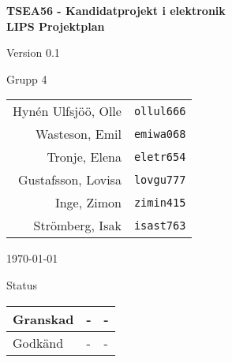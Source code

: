 \documentclass[11pt]{article}
\begin{document}
\begin{titlepage}
\begin{center}

{\Large\bfseries TSEA56 - Kandidatprojekt i elektronik \\ LIPS Projektplan}

\vspace{5em}

Version 0.1

\vspace{5em}
Grupp 4 \\
\begin{tabular}{rl}
Hynén Ulfsjöö, Olle&\verb+ollul666+
\\
Wasteson, Emil&\verb+emiwa068+
\\
Tronje, Elena&\verb+eletr654+
\\
Gustafsson, Lovisa&\verb+lovgu777+
\\
Inge, Zimon&\verb+zimin415+
\\
Strömberg, Isak&\verb+isast763+
\\
\end{tabular}

\vspace{5em}
\today

\vspace{16em}
Status
\begin{longtable}{|l|l|l|} \hline

Granskad & - & - \\ \hline
Godkänd & - & - \\ \hline
 
\end{longtable}

\end{center}
\end{titlepage}
\end{document}
